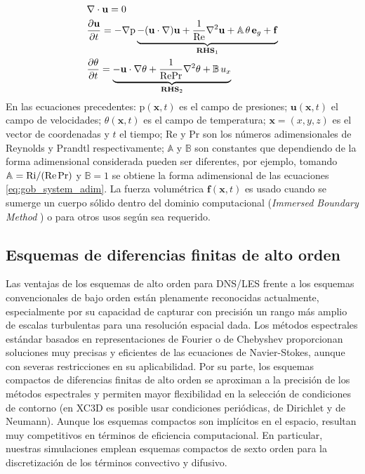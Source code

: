 \begin{equation}
\begin{aligned}
&\nabla \cdot \mathbf{u} = 0 \\
& \frac{\partial \mathbf{u}}{\partial t} = -\nabla \text{p} \underbrace{- (\mathbf{u} \cdot \nabla)\mathbf{u} + \frac{1}{\text{Re}} \nabla^2 \mathbf{u} + \mathbb{A} \hspace{0.5mm} \theta \hspace{0.5mm} \mathbf{e}_g + \mathbf{f} }_{\textbf{RHS}_{1}} \\
& \frac{\partial \theta}{\partial t} = \underbrace{- \mathbf{u} \cdot \nabla \theta + \frac{1}{\text{Re} \text{Pr}} \nabla^2 \theta + \mathbb{B} \hspace{0.5mm} u_x }_{\textbf{RHS}_2} \\
\end{aligned}
\label{eq:sistem2}
\end{equation}
En las ecuaciones precedentes: $\text{p}(\mathbf{x},t)$ es el campo de presiones; $\mathbf{u}(\mathbf{x},t)$ el campo de velocidades; $\theta(\mathbf{x},t)$ es el campo de temperatura; $\mathbf{x} = (x,y,z)$ es el vector de coordenadas y $t$ el tiempo; Re y Pr son los números adimensionales de Reynolds y Prandtl respectivamente; $\mathbb{A}$ y $\mathbb{B}$ son constantes que dependiendo de la forma adimensional considerada pueden ser diferentes, por ejemplo, tomando $\mathbb{A}=\text{Ri} / (\text{Re} \hspace{0.5mm} \text{Pr})$ y $\mathbb{B}=1$  se obtiene la forma adimensional de las ecuaciones \ref{eq:gob_system_adim}. La fuerza volumétrica $\mathbf{f}(\mathbf{x},t)$ es usado cuando se sumerge un cuerpo sólido dentro del dominio computacional (\textit{Immersed Boundary Method} \cite{peskin2002immersed}) o para otros usos según sea requerido.


\subsection{Esquemas de diferencias finitas de alto orden}

Las ventajas de los esquemas de alto orden para DNS/LES frente a los esquemas convencionales de bajo orden están plenamente reconocidas actualmente, especialmente por su capacidad de capturar con precisión un rango más amplio de escalas turbulentas para una resolución espacial dada. Los métodos espectrales estándar basados en representaciones de Fourier o de Chebyshev proporcionan soluciones muy precisas y eficientes de las ecuaciones de Navier-Stokes, aunque con severas restricciones en su aplicabilidad. Por su parte, los esquemas compactos de diferencias finitas de alto orden se aproximan a la precisión de los métodos espectrales y permiten mayor flexibilidad en la selección de condiciones de contorno (en XC3D es posible usar condiciones periódicas, de Dirichlet y de Neumann). Aunque los esquemas compactos son implícitos en el espacio, resultan muy competitivos en términos de eficiencia computacional. En particular, nuestras simulaciones emplean esquemas compactos de sexto orden para la discretización de los términos convectivo y difusivo.

